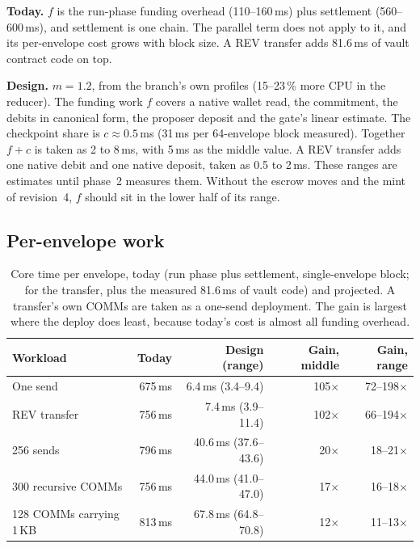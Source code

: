 \documentclass[11pt]{article}
\begin{document}
\textbf{Today.} $f$ is the run-phase funding overhead (110--160\,ms) plus settlement (560--600\,ms), and settlement is one chain. The parallel term does not apply to it, and its per-envelope cost grows with block size. A REV transfer adds 81.6\,ms of vault contract code on top.

\textbf{Design.} $m = 1.2$, from the branch's own profiles (15--23\,\% more CPU in the reducer). The funding work $f$ covers a native wallet read, the commitment, the debits in canonical form, the proposer deposit and the gate's linear estimate. The checkpoint share is $c \approx 0.5$\,ms (31\,ms per 64-envelope block measured). Together $f + c$ is taken as 2 to 8\,ms, with 5\,ms as the middle value. A REV transfer adds one native debit and one native deposit, taken as 0.5 to 2\,ms. These ranges are estimates until phase~2 measures them. Without the escrow moves and the mint of revision~4, $f$ should sit in the lower half of its range.

\subsection{Per-envelope work}

\begin{table}[h]
\centering\small
\begin{tabular}{@{}lrrrr@{}}
\toprule
\textbf{Workload} & \textbf{Today} & \textbf{Design (range)} & \textbf{Gain, middle} & \textbf{Gain, range} \\
\midrule
One send & 675\,ms & 6.4\,ms (3.4--9.4) & 105$\times$ & 72--198$\times$ \\
REV transfer & 756\,ms & 7.4\,ms (3.9--11.4) & 102$\times$ & 66--194$\times$ \\
256 sends & 796\,ms & 40.6\,ms (37.6--43.6) & 20$\times$ & 18--21$\times$ \\
300 recursive COMMs & 756\,ms & 44.0\,ms (41.0--47.0) & 17$\times$ & 16--18$\times$ \\
128 COMMs carrying 1\,KB & 813\,ms & 67.8\,ms (64.8--70.8) & 12$\times$ & 11--13$\times$ \\
\bottomrule
\end{tabular}
\caption{Core time per envelope, today (run phase plus settlement, single-envelope block; for the transfer, plus the measured 81.6\,ms of vault code) and projected. A transfer's own COMMs are taken as a one-send deployment. The gain is largest where the deploy does least, because today's cost is almost all funding overhead.}
\label{tab:gain}
\end{table}
\end{document}
